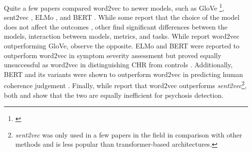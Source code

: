 
Quite a few papers compared word2vec to newer models, such as GloVe \footnote{\citep{iter2018automatic, just2019coherence, tang2022clinical, tang2023latent, just2023validation}}, sent2vec \citep{iter2018automatic, just2019coherence, hitczenko2021understanding}, ELMo \citep{ryazanskaya2020thesis, hitczenko2021understanding, sarzynska2021detecting}, and BERT \citep{ryazanskaya2020thesis, hitczenko2021understanding, xu2022fully}. While some report that the choice of the model does not affect the outcomes \citep{hitczenko2021understanding, fradkin2023theory}, other find significant differences between the models, interaction between models, metrics, and tasks. While \citet{iter2018automatic, just2023validation} report word2vec outperforming GloVe, \citet{just2019coherence} observe the opposite. ELMo and BERT were reported to outperform word2vec in symptom severity assessment \citep{ryazanskaya2020thesis} but proved equally unsuccessful as word2vec in distinguishing CHR from controls \citep{hitczenko2021understanding}. Additionally, BERT and its variants were shown to outperform word2vec in predicting human coherence judgement \citep{xu2022fully}. Finally, while \citet{iter2018automatic} report that word2vec outperforms \textit{sent2vec}\footnote{\textit{sent2vec}\citep{moghadasi2020sent2vec} was only used in a few papers in the field in comparison with other methods and is less popular than transformer-based architectures.}, both \citet{just2019coherence} and \citep{hitczenko2021understanding} show that the two are equally inefficient for psychosis detection.


